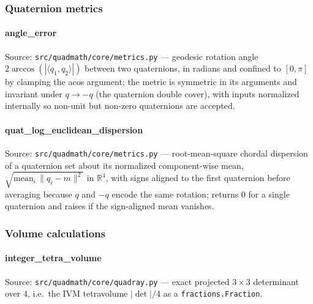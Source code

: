\documentclass[
  10pt,
]{article}
\newcommand{\passthrough}[1]{#1}
\renewcommand{\texttt}[1]{%
    \colorbox{codebg}{\color{codefg}\ttfamily #1}%
}
\begin{document}
\subsubsection{Quaternion metrics}\label{code:quaternion_metrics}

\paragraph{\texorpdfstring{\texttt{angle\_error}}{angle\_error}}\label{code:angle_error}

Source: \passthrough{\lstinline!src/quadmath/core/metrics.py!} ---
geodesic rotation angle \(2\arccos(|\langle q_1, q_2\rangle|)\) between
two quaternions, in radians and confined to \([0, \pi]\) by clamping the
acos argument; the metric is symmetric in its arguments and invariant
under \(q \to -q\) (the quaternion double cover), with inputs normalized
internally so non-unit but non-zero quaternions are accepted.

\paragraph{\texorpdfstring{\texttt{quat\_log\_euclidean\_dispersion}}{quat\_log\_euclidean\_dispersion}}\label{code:quat_log_euclidean_dispersion}

Source: \passthrough{\lstinline!src/quadmath/core/metrics.py!} ---
root-mean-square chordal dispersion of a quaternion set about its
normalized component-wise mean,
\(\sqrt{\mathrm{mean}_i\,\|q_i - m\|^2}\) in \(\mathbb{R}^4\), with
signs aligned to the first quaternion before averaging because \(q\) and
\(-q\) encode the same rotation; returns 0 for a single quaternion and
raises if the sign-aligned mean vanishes.

\subsubsection{Volume calculations}\label{code:volume_calculations}

\paragraph{\texorpdfstring{\texttt{integer\_tetra\_volume}}{integer\_tetra\_volume}}\label{code:integer_tetra_volume}

Source: \passthrough{\lstinline!src/quadmath/core/quadray.py!} --- exact
projected \(3\times3\) determinant over 4, i.e.~the IVM tetravolume
\(|\det|/4\) as a \passthrough{\lstinline!fractions.Fraction!}.
\end{document}
